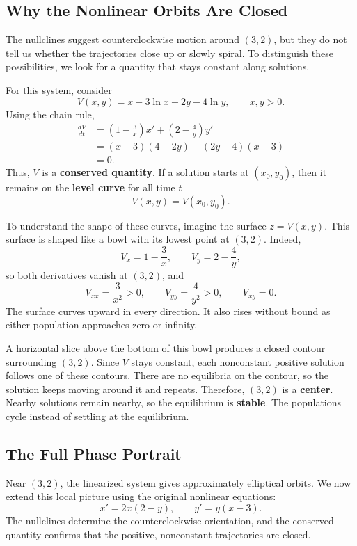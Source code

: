 \documentclass[10pt,letterpaper]{article}
\begin{document}

\subsection{Why the Nonlinear Orbits Are Closed}

The nullclines suggest counterclockwise motion around
$(3,2)$, but they do not tell us whether the trajectories
close up or slowly spiral. To distinguish these possibilities,
we look for a quantity that stays constant along solutions.

For this system, consider
\[
V(x,y)=x-3\ln x+2y-4\ln y,
\qquad x,y>0.
\]
Using the chain rule,
\begin{align*}
\frac{dV}{dt}
&=\left(1-\frac3x\right)x'
 +\left(2-\frac4y\right)y'\\
&=(x-3)(4-2y)+(2y-4)(x-3)\\
&=0.
\end{align*}
Thus, $V$ is a \textbf{conserved quantity}.
If a solution starts at $(x_0,y_0)$, then it remains
on the \textbf{level curve} for all time $t$
\[
V(x,y)=V(x_0,y_0).
\]

To understand the shape of these curves, imagine the
surface $z=V(x,y)$. This surface is shaped like a bowl
with its lowest point at $(3,2)$. Indeed,
\[
V_x=1-\frac3x,\qquad V_y=2-\frac4y,
\]
so both derivatives vanish at $(3,2)$, and
\[
V_{xx}=\frac3{x^2}>0,\qquad
V_{yy}=\frac4{y^2}>0,\qquad V_{xy}=0.
\]
The surface curves upward in every direction.
It also rises without bound as either population
approaches zero or infinity.

A horizontal slice above the bottom of this bowl
produces a closed contour surrounding $(3,2)$.
Since $V$ stays constant, each nonconstant positive
solution follows one of these contours.
There are no equilibria on the contour, so the
solution keeps moving around it and repeats. Therefore, $(3,2)$ is a \textbf{center}.
Nearby solutions remain nearby, so the equilibrium
is \textbf{stable}. The populations cycle instead
of settling at the equilibrium.


\subsection{The Full Phase Portrait}

Near $(3,2)$, the linearized system gives approximately
elliptical orbits. We now extend this local picture
using the original nonlinear equations:
\[
x'=2x(2-y),\qquad y'=y(x-3).
\]
The nullclines determine the counterclockwise orientation,
and the conserved quantity confirms that the positive,
nonconstant trajectories are closed.
\end{document}
